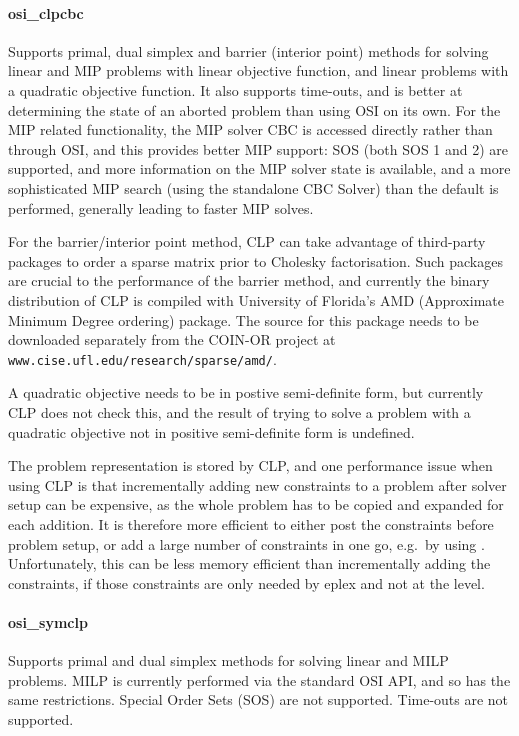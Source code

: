 \paragraph{osi_clpcbc} Supports primal, dual simplex and barrier (interior
point) methods for
solving linear and MIP problems with linear objective function, and linear
problems with a quadratic objective function. It also supports time-outs, and is better 
at determining the state of an aborted problem than using OSI on its own.
For the MIP related functionality, the MIP solver CBC is accessed directly
rather than through OSI, and this 
provides better MIP support: SOS (both SOS 1 and 2) are supported, and more information on the MIP
solver state is available, and a more sophisticated MIP search (using the
standalone CBC Solver) than the default is performed, generally
leading to faster MIP solves.

For the barrier/interior point method, CLP can take advantage of
third-party packages to order a sparse matrix prior to Cholesky
factorisation. Such packages are crucial to the performance of the
barrier method, and currently the binary distribution of CLP is compiled
with University of Florida's AMD (Approximate Minimum Degree ordering) 
package. The source for this package needs to be downloaded separately from
the COIN-OR project at {\tt www.cise.ufl.edu/research/sparse/amd/}. 

A quadratic objective needs to be in postive semi-definite form, but
currently CLP does not check this, and the result of trying to solve a
problem with a quadratic objective not in positive semi-definite form
is undefined.

The problem representation is stored by CLP, and one performance issue 
when using CLP is that incrementally adding new constraints to
a problem after solver setup can be expensive, as the whole problem has to
be copied and expanded for each addition. It is therefore more efficient to 
either post the constraints before problem setup, or add a large number of
constraints in one go, e.g.\ by using 
.
Unfortunately, this can be less memory efficient than incrementally adding
the constraints, if those constraints are only needed by eplex and not at
the {\eclipse} level.

\paragraph{osi_symclp} Supports primal and dual simplex methods for
solving linear and MILP problems. MILP is currently performed via the 
standard OSI API, and so has the same restrictions. Special Order Sets
(SOS) are not supported. Time-outs are not supported.
 
